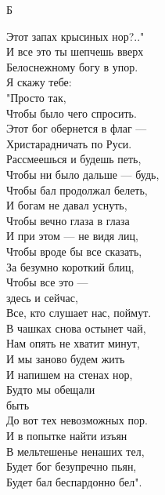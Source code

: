 \begin{poem}{Б}{~}
\begin{altverse}
	Этот запах крысиных нор?.."\\
	И все это ты шепчешь вверх\\
	Белоснежному богу в упор.\\
	Я скажу тебе:\\
	"Просто так,\\
	Чтобы было чего спросить.\\
	Этот бог обернется в флаг ---\\
	Христарадничать по Руси.\\
	Рассмеешься и будешь петь,\\
	Чтобы ни было дальше --- будь,\\
	Чтобы бал продолжал белеть,\\
	И богам не давал уснуть,\\
	Чтобы вечно глаза в глаза\\
	И при этом --- не видя лиц,\\
	Чтобы вроде бы все сказать,\\
	За безумно короткий блиц,\\
	Чтобы все это ---\\
	здесь и сейчас,\\
	Все, кто слушает нас, поймут.\\
	В чашках снова остынет чай,\\
	Нам опять не хватит минут,\\
	И мы заново будем жить\\
	И напишем на стенах нор,\\
	Будто мы обещали \\
	быть\\
	До вот тех невозможных пор.\\
	И в попытке найти изъян\\
	В мельтешенье ненаших тел,\\
	Будет бог безупречно пьян,\\
	Будет бал беспардонно бел".\\
	\end{altverse}
\end{poem}


